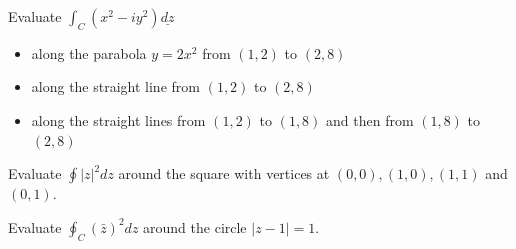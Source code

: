 \documentclass[11pt]{beamer}
\theoremstyle{plain}
\begin{document}
\begin{frame}
    \begin{example}
        Evaluate $\int_C\left(x^2-i y^2\right) \underline{d z}$
        \begin{itemize}
            \item along the parabola $y=2 x^2$ from $(1,2)$ to $(2,8)$
            \item along the straight line from $(1,2)$ to $(2,8)$
            \item  along the straight lines from $(1,2)$ to $(1,8)$ and then from $(1,8)$ to $(2,8)$
        \end{itemize}
    \end{example}
    \begin{example}
        Evaluate $\oint |z|^2 dz$ around the square with vertices at $(0,0), (1,0), (1,1)$ and $(0,1)$. 
    \end{example}
    \begin{example}
        Evaluate $\oint_C (\bar z)^2 dz$ around the circle $|z-1|=1$.
    \end{example}
\end{frame}
\end{document}

